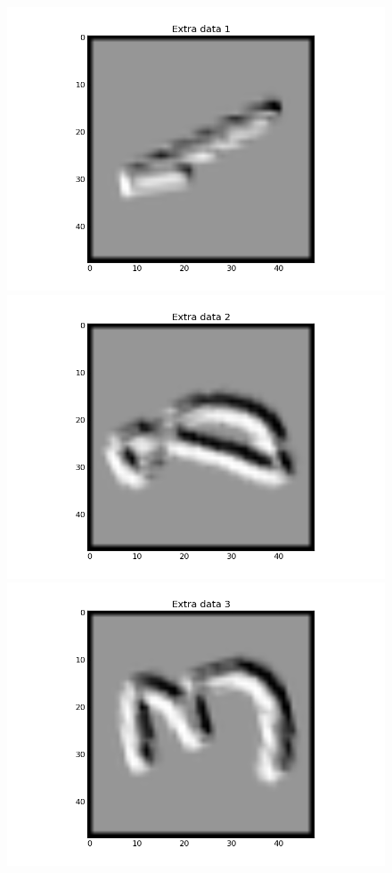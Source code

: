 \documentclass[conference]{IEEEtran}
\begin{document}
\begin{figure}[h]
	\centering
	\includegraphics[scale=0.20]{Extradata1.png}
	\includegraphics[scale=0.20]{Extradata2.png}
	\includegraphics[scale=0.20]{Extradata3.png}

\end{figure}
\end{document}
